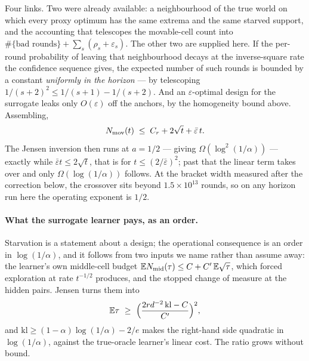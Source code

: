 Four links. Two were already available: a neighbourhood of the true world on which every
proxy optimum has the same extrema and the same starved support, and the accounting that
telescopes the movable-cell count into $\#\{\text{bad rounds}\}+\sum_{s}(\rho_{s}+
\varepsilon_{s})$. The other two are supplied here. If the per-round probability of
leaving that neighbourhood decays at the inverse-square rate the confidence sequence gives,
the expected number of such rounds is bounded by a constant \emph{uniformly in the
horizon} --- by telescoping $1/(s+2)^{2}\le1/(s+1)-1/(s+2)$. And an $\varepsilon$-optimal
design for the surrogate leaks only $O(\varepsilon)$ off the anchors, by the homogeneity
bound above. Assembling,
\begin{equation}
N_{\rm mov}(t)\;\le\;C_{r}+2\sqrt{t}+\bar\varepsilon\,t .
\label{eq:cumexp}
\end{equation}
The Jensen inversion then runs at $a=1/2$ --- giving $\Omega(\log^{2}(1/\alpha))$ ---
exactly while $\bar\varepsilon t\le2\sqrt t$, that is for $t\le(2/\bar\varepsilon)^{2}$;
past that the linear term takes over and only $\Omega(\log(1/\alpha))$ follows. At the
bracket width measured after the correction below, the crossover sits beyond
$1.5\times10^{13}$ rounds, so on any horizon run here the operating exponent is $1/2$.



\paragraph{What the surrogate learner pays, as an order.}
Starvation is a statement about a design; the operational consequence is an order in
$\log(1/\alpha)$, and it follows from two inputs we name rather than assume away: the
learner's own middle-cell budget $\mathbb E N_{\rm mid}(\tau)\le C+C'\,\mathbb E\sqrt\tau$,
which forced exploration at rate $t^{-1/2}$ produces, and the stopped change of measure at
the hidden pairs. Jensen turns them into
\[
\mathbb E\tau\ \ge\ \Bigl(\frac{2r d^{-2}\,\mathrm{kl}-C}{C'}\Bigr)^{2},
\]
and $\mathrm{kl}\ge(1-\alpha)\log(1/\alpha)-2/e$ makes the right-hand side quadratic in
$\log(1/\alpha)$, against the true-oracle learner's linear cost. The ratio grows without
bound.

